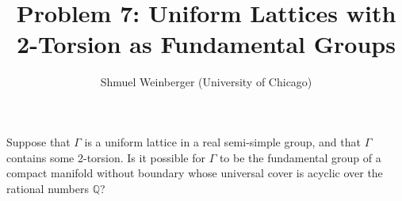

\title{Problem 7: Uniform Lattices with 2-Torsion as Fundamental Groups}
\author{Shmuel Weinberger (University of Chicago)}
\date{}


\maketitle

Suppose that $\Gamma$ is a uniform lattice in a real semi-simple group, and that $\Gamma$ contains some 2-torsion. Is it possible for $\Gamma$ to be the fundamental group of a compact manifold without boundary whose universal cover is acyclic over the rational numbers $\mathbb{Q}$?


